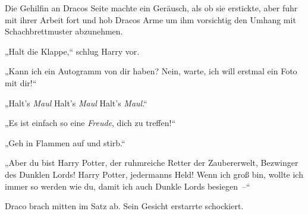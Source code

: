 Die Gehilfin an Dracos Seite machte ein Geräusch, als ob sie erstickte, aber fuhr mit ihrer Arbeit fort und hob Dracos Arme um ihm vorsichtig den Umhang mit Schachbrettmuster abzunehmen.

„Halt die Klappe,“ schlug Harry vor.

„Kann ich ein Autogramm von dir haben? Nein, warte, ich will erstmal ein Foto mit dir!“

„Halt's \emph{Maul} Halt's \emph{Maul} Halt's \emph{Maul}.“

„Es ist einfach so eine \emph{Freude}, dich zu treffen!“

„Geh in Flammen auf und stirb.“

„Aber du bist Harry Potter, der ruhmreiche Retter der Zaubererwelt, Bezwinger des Dunklen Lords! Harry Potter, jedermanns Held! Wenn ich groß bin, wollte ich immer so werden wie du, damit ich auch Dunkle Lords besiegen –“

Draco brach mitten im Satz ab. Sein Gesicht erstarrte schockiert.

